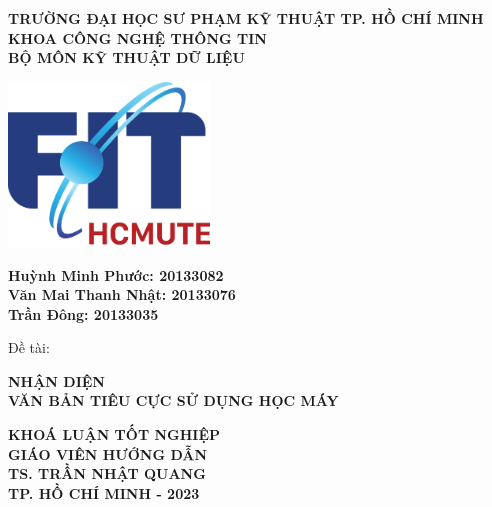 \thispagestyle{empty}
\begin{center}
    \fontsize{14pt}{21pt}
    \textbf{TRƯỜNG ĐẠI HỌC SƯ PHẠM KỸ THUẬT TP. HỒ CHÍ MINH}\\
    \textbf{KHOA CÔNG NGHỆ THÔNG TIN}\\
    \textbf{BỘ MÔN KỸ THUẬT DỮ LIỆU}\\
\end{center}

\vspace{0.5cm}
\begin{center}
    \includegraphics[width=0.4\textwidth]{prelims/image/logo-cntt2021.png}
\end{center}
\vspace{0.5cm}

\begin{center}
    \fontsize{14pt}{21pt}
    \textbf{Huỳnh Minh Phước: 20133082}\\
    \textbf{Văn Mai Thanh Nhật: 20133076}\\
    \textbf{Trần Đông: 20133035}\\
    \begin{minipage}{0.8\textwidth}
        \fontsize{14pt}{21pt}
        Đề tài:
    \end{minipage}
\end{center}
\begin{center}
    \fontsize{20pt}{30pt}
    \textbf{NHẬN DIỆN\\VĂN BẢN TIÊU CỰC SỬ DỤNG HỌC MÁY}\\
\end{center}
\vspace{0.3cm}
\begin{center}
    \fontsize{14pt}{21pt}
    \textbf{KHOÁ LUẬN TỐT NGHIỆP}\\
    \vspace{1CM}
    \textbf{GIÁO VIÊN HƯỚNG DẪN}\\
    \textbf{TS. TRẦN NHẬT QUANG}\\
    \vfill
    \textbf{TP. HỒ CHÍ MINH - 2023}
\end{center}
\restoregeometry
